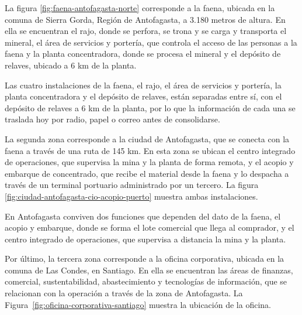 \documentclass[subdoc]{../../comun/overfore}
\begin{document}
La figura \ref{fig:faena-antofagasta-norte} corresponde a la faena, ubicada en la comuna de Sierra Gorda, Región de Antofagasta, a 3.180 metros de altura. En ella se encuentran el rajo, donde se perfora, se trona y se carga y transporta el mineral, el área de servicios y portería, que controla el acceso de las personas a la faena y la planta concentradora, donde se procesa el mineral y el depósito de relaves, ubicado a 6 km de la planta.

Las cuatro instalaciones de la faena, el rajo, el área de servicios y portería, la planta concentradora y el depósito de relaves, están separadas entre sí, con el depósito de relaves a 6 km de la planta, por lo que la información de cada una se traslada hoy por radio, papel o correo antes de consolidarse.

La segunda zona corresponde a la ciudad de Antofagasta, que se conecta con la faena a través de una ruta de 145 km. En esta zona se ubican el centro integrado de operaciones, que supervisa la mina y la planta de forma remota, y el acopio y embarque de concentrado, que recibe el material desde la faena y lo despacha a través de un terminal portuario administrado por un tercero. La figura \ref{fig:ciudad-antofagasta-cio-acopio-puerto} muestra ambas instalaciones.

En Antofagasta conviven dos funciones que dependen del dato de la faena, el acopio y embarque, donde se forma el lote comercial que llega al comprador, y el centro integrado de operaciones, que supervisa a distancia la mina y la planta.

Por último, la tercera zona corresponde a la oficina corporativa, ubicada en la comuna de Las Condes, en Santiago. En ella se encuentran las áreas de finanzas, comercial, sustentabilidad, abastecimiento y tecnologías de información, que se relacionan con la operación a través de la zona de Antofagasta. La Figura~\ref{fig:oficina-corporativa-santiago} muestra la ubicación de la oficina.
\end{document}
